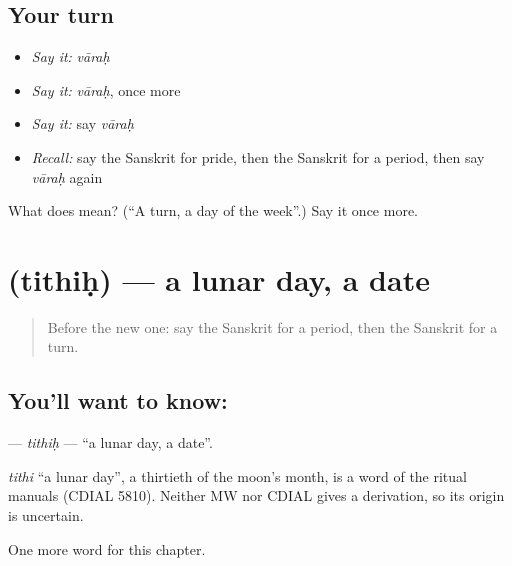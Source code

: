 \subsection*{Your turn}
\begin{itemize}
\raggedright
  \item \emph{Say it:} \emph{vāraḥ}
  \item \emph{Say it:} \emph{vāraḥ}, once more
  \item \emph{Say it:} say \emph{vāraḥ}
  \item \emph{Recall:} say the Sanskrit for pride, then the Sanskrit for a period, then say \emph{vāraḥ} again
\end{itemize}

\begin{tcolorbox}[breakable,colback=teal!4,colframe=teal!35!black,title={Before you move on}]
What does  mean? (\textquotedblleft{}A turn, a day of the week\textquotedblright{}.) Say it once more.
\end{tcolorbox}
\section[\texorpdfstring{\sk{तिथिः} (tithiḥ)}{तिथिः (tithiḥ)}]{ (tithiḥ) — a lunar day, a date}

\label{lesson:SA-C152-tithih}



\begin{quote}
Before the new one: say the Sanskrit for a period, then the Sanskrit for a turn.
\end{quote}

\subsection*{You'll want to know: }
\textbf{} — \emph{tithiḥ} — \textquotedblleft{}a lunar day, a date\textquotedblright{}.

\begin{cousinweb}
\emph{tithi} \textquotedblleft{}a lunar day\textquotedblright{}, a thirtieth of the moon's month, is a word of the ritual manuals (CDIAL 5810). Neither MW nor CDIAL gives a derivation, so its origin is uncertain.
\end{cousinweb}

\begin{grammarlens}[title={What you've built}]
One more word for this chapter.
\end{grammarlens}

